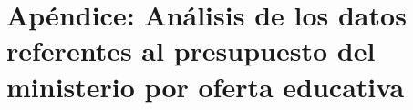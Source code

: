 \documentclass[a4paper, 9pt, conference]{article}
\begin{document}
\section{Ap\'endice: An\'alisis de los datos referentes al presupuesto del ministerio por oferta educativa} \label{att:dashboard}




\end{document}
